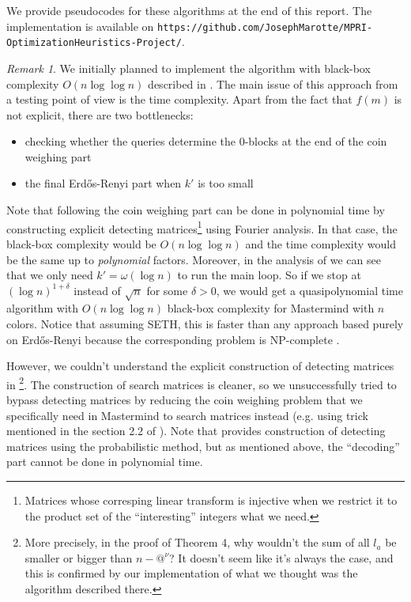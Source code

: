 \documentclass[12pt]{article}
\theoremstyle{definition}
\theoremstyle{plain}
\theoremstyle{remark}
\newtheorem*{remark}{Remark}
\begin{document}
We provide pseudocodes for these algorithms at the end of this report. The implementation
is available on \texttt{https://github.com/JosephMarotte/MPRI-OptimizationHeuristics-Project/}.

\begin{remark}
	We initially planned to implement the algorithm with black-box complexity
        $O(n\log \log n)$ described in \cite{DOERR}. The main issue of this approach from
	a testing point of view is the time complexity. Apart from the fact that $f(m)$ is not
	explicit, there are two bottlenecks:

	\begin{itemize}
		\item checking whether the queries determine
		the 0-blocks at the end of the coin weighing part
		\item the final Erd\H{o}s-Renyi part when $k'$ is too small
	\end{itemize}

        Note that following \cite{BSHOUTY} the coin weighing part can be done in polynomial time by constructing
        explicit detecting matrices\footnote{Matrices whose corresping linear transform is injective when we restrict
        it to the product set of the ``interesting'' integers what we need.} using Fourier analysis. In that case, the
        black-box complexity would be $O(n\log \log n)$ and the time complexity would be the same up to
        \textit{polynomial} factors. Moreover,
        in the analysis of \cite{DOERR} we can see that we only need $k'=\omega(\log n)$ to run the main loop. So
	if we stop at $(\log n)^{1+\delta}$ instead of $\sqrt{n}$ for some $\delta>0$, we would get a
	quasipolynomial time algorithm with $O(n\log \log n)$ black-box complexity for Mastermind with $n$
	colors. Notice that assuming SETH, this is faster than any approach based purely on Erd\H{o}s-Renyi
        because the corresponding problem is NP-complete \cite{GOODRICH}.

        However, we couldn't understand the explicit construction of detecting matrices in \cite{BSHOUTY}\footnote{More
	precisely, in the proof of Theorem 4, why wouldn't the sum of all $l_a$ be smaller or bigger than
        $n-@^\nu$? It doesn't seem like it's always the case, and this is confirmed by our implementation
        of what we thought was the algorithm described there.}.
        The construction of
	search matrices is cleaner, so we unsuccessfully tried to bypass 
	detecting matrices by reducing the coin weighing problem that we specifically need in Mastermind to search matrices
        instead (e.g. using trick mentioned in the section 2.2 of \cite{CHOI}). Note that
        \cite{GREBINSKI} provides construction of detecting matrices
        using the probabilistic method, but as mentioned above, the ``decoding'' part cannot be done in polynomial 
        time.
		
\end{remark}
\end{document}
